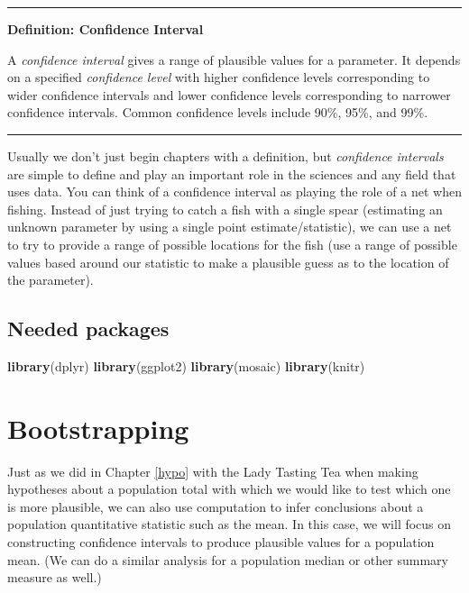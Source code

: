 \documentclass[]{tufte-book}
\newenvironment{Shaded}{\begin{snugshade}}{\end{snugshade}}
\newcommand{\KeywordTok}[1]{\textcolor[rgb]{0.13,0.29,0.53}{\textbf{{#1}}}}
\newcommand{\NormalTok}[1]{{#1}}
\let\oldrule=\rule
\renewcommand{\rule}[1]{\oldrule{\linewidth}}
\begin{document}
\begin{center}\rule{0.5\linewidth}{\linethickness}\end{center}

\textbf{Definition: Confidence Interval}

A \emph{confidence interval} gives a range of plausible values for a
parameter. It depends on a specified \emph{confidence level} with higher
confidence levels corresponding to wider confidence intervals and lower
confidence levels corresponding to narrower confidence intervals. Common
confidence levels include 90\%, 95\%, and 99\%.

\begin{center}\rule{0.5\linewidth}{\linethickness}\end{center}

Usually we don't just begin chapters with a definition, but
\emph{confidence intervals} are simple to define and play an important
role in the sciences and any field that uses data. You can think of a
confidence interval as playing the role of a net when fishing. Instead
of just trying to catch a fish with a single spear (estimating an
unknown parameter by using a single point estimate/statistic), we can
use a net to try to provide a range of possible locations for the fish
(use a range of possible values based around our statistic to make a
plausible guess as to the location of the parameter).

\subsection*{Needed packages}\label{needed-packages-5}

\begin{Shaded}
\begin{Highlighting}[]
\KeywordTok{library}\NormalTok{(dplyr)}
\KeywordTok{library}\NormalTok{(ggplot2)}
\KeywordTok{library}\NormalTok{(mosaic)}
\KeywordTok{library}\NormalTok{(knitr)}
\end{Highlighting}
\end{Shaded}

\section{Bootstrapping}\label{bootstrapping}

Just as we did in Chapter \ref{hypo} with the Lady Tasting Tea when
making hypotheses about a population total with which we would like to
test which one is more plausible, we can also use computation to infer
conclusions about a population quantitative statistic such as the mean.
In this case, we will focus on constructing confidence intervals to
produce plausible values for a population mean. (We can do a similar
analysis for a population median or other summary measure as well.)
\end{document}
